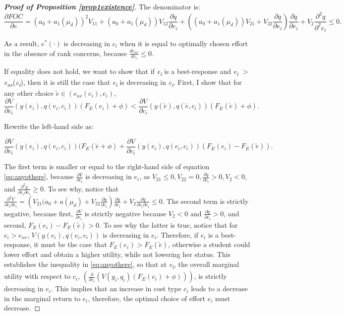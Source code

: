 \begin{proof}[{\bf Proof of Proposition \ref{prop1existence}}]
\noindent The denominator is:
$$\frac{\partial FOC}{\partial e}=(a_0+a_1(\mu_d))^2V_{11}+(a_0+a_1(\mu_d))V_{12}\frac{\partial q}{\partial e_i}+\left((a_0+a_1(\mu_d))V_{21}+V_{22}\frac{\partial q}{\partial e_i}\right)\frac{\partial q}{\partial e_i}+V_2\frac{\partial^2 q}{\partial^2 e_i}\leq 0.$$


\noindent As a result, $e^{*}(\cdot)$ is decreasing in $c_i$ when it is equal to optimally chosen effort in the absence of rank concerns, because $\frac{d e_{nr}}{d c_i}\leq 0$.\par 

If equality does not hold, we want to show that if \textit{e\textsubscript{i }}is a
best-response and \textit{e\textsubscript{i }$>$ e\textsubscript{nr}}(\textit{c\textsubscript{i}}), then it is still the
case that \textit{e\textsubscript{i }}is decreasing
in \textit{c\textsubscript{i}}. First, I show that
for any other choice $\tilde{e}\in (e_{nr}(c_i),e_i)$,
\begin{equation}\label{eq:anyothere}
    \frac{\partial V}{\partial c_i}(y(e_i),q(e_i,c_i)) (F_E(e_i)+\phi)<\frac{\partial V}{\partial c_i}(y(\tilde{e}),q(\tilde{e},c_i))(F_E(\tilde{e})+\phi).
\end{equation}

\noindent Rewrite the left-hand side as:

$$\frac{\partial V}{\partial c_i}(y(e_i),q(e_i,c_i))(F_E(\tilde{e}+\phi)+\frac{\partial V}{\partial c_i}(y(e_i),q(e_i,c_i))(F_E(e_i)-F_E(\tilde{e})).$$

\noindent The first term is smaller or equal to the right-hand side of equation \eqref{eq:anyothere}, because $\frac{\partial V}{\partial c_i}$ is decreasing in $e_i$, as $V_{21}\leq 0,V_{22}=0, \frac{\partial q}{\partial c_i}>0, V_2<0,$ and $\frac{\partial^2 q}{\partial c_i \partial e_i}\geq 0$. To see why, notice that $\frac{\partial^2 V}{\partial c_i \partial e_i}=\left(V_{21}(a_0+a(\mu_d)+V_{22}\frac{\partial q}{\partial e_i}\right)\frac{\partial q}{\partial c_i}+V_2 \frac{\partial q}{\partial c_i \partial e_i}\leq 0$. The second term is strictly
negative, because first, $\frac{\partial V}{\partial c_i}$ is strictly negative because $V_2<0$ and $\frac{\partial q}{\partial c_i}>0$, and second, $F_E(e_i)-F_E(\tilde{e})>0$. To see why the latter is
true, notice that for $e_i>e_{nr}$, $V(y(e_i),q(e_i,c_i))$ is decreasing in
$e_i$. Therefore, if $e_i$ is a best-response, it must be the case that $F_E(e_i)>F_E(\tilde{e})$,
otherwise a student could lower effort and obtain a higher utility, while not
lowering her status. This establishes the inequality in \eqref{eq:anyothere}, so that at \textit{e\textsubscript{i}}, the overall marginal
utility with respect to $c_i$, $(\frac{\partial}{\partial c_i}(V(y_i,q_i)(F_E(e_i)+\phi)))$,
is strictly decreasing in $e_i$. This
implies that an increase in cost type $c_i$ leads
to a decrease in the marginal return to $e_i$,
therefore, the optimal choice of effort $e_i$ must decrease.


\end{proof}
